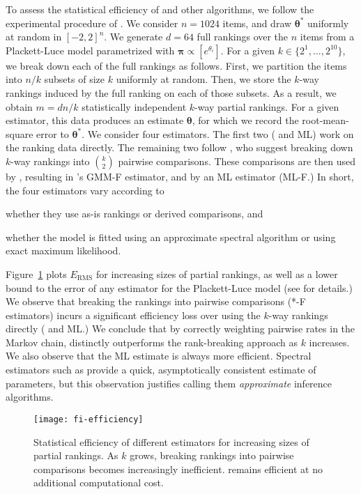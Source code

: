 To assess the statistical efficiency of \LSR{} and other algorithms, we follow the experimental procedure of \citet{hajek2014minimax}.
We consider $n = 1024$ items, and draw $\bm{\theta}^*$ uniformly at random in $[-2, 2]^n$.
We generate $d = 64$ full rankings over the $n$ items from a Plackett-Luce model parametrized with $\bm{\pi} \propto [e^{\theta_i}]$.
For a given $k \in \{2^1, \ldots, 2^{10}\}$, we break down each of the full rankings as follows.
First, we partition the items into $n/k$ subsets of size $k$ uniformly at random.
Then, we store the $k$-way rankings induced by the full ranking on each of those subsets.
As a result, we obtain $m = dn/k$ statistically independent $k$-way partial rankings.
For a given estimator, this data produces an estimate $\bm{\theta}$, for which we record the root-mean-square error to $\bm{\theta}^*$.
We consider four estimators.
The first two (\LSR{} and ML) work on the ranking data directly.
The remaining two follow \citet{azari2013generalized}, who suggest breaking down $k$-way rankings into $\binom{k}{2}$ pairwise comparisons.
These comparisons are then used by \LSR{}, resulting in \citeauthor{azari2013generalized}'s GMM-F estimator, and by an ML estimator (ML-F.)
In short, the four estimators vary according to
\begin{enuminline}
\item whether they use as-is rankings or derived comparisons, and
\item whether the model is fitted using an approximate spectral algorithm or using exact maximum likelihood.
\end{enuminline}
Figure~\ref{fi:fig:efficiency} plots $E_{\text{RMS}}$ for increasing sizes of partial rankings, as well as a lower bound to the error of any estimator for the Plackett-Luce model (see \citet{hajek2014minimax} for details.)
We observe that breaking the rankings into pairwise comparisons (*-F estimators) incurs a significant efficiency loss over using the $k$-way rankings directly (\LSR{} and ML.)
We conclude that by correctly weighting pairwise rates in the Markov chain, \LSR{} distinctly outperforms the rank-breaking approach as $k$ increases.
We also observe that the ML estimate is always more efficient.
Spectral estimators such as \LSR{} provide a quick, asymptotically consistent estimate of parameters, but this observation justifies calling them \emph{approximate} inference algorithms.


\begin{figure}[ht]
\centering
\texttt{[image: fi-efficiency]}
\vskip -0.1in
\caption{
Statistical efficiency of different estimators for increasing sizes of partial rankings.
As $k$ grows, breaking rankings into pairwise comparisons becomes increasingly inefficient.
\LSR{} remains efficient at no additional computational cost.
}
\vskip -0.1in
\label{fi:fig:efficiency}
\end{figure}

